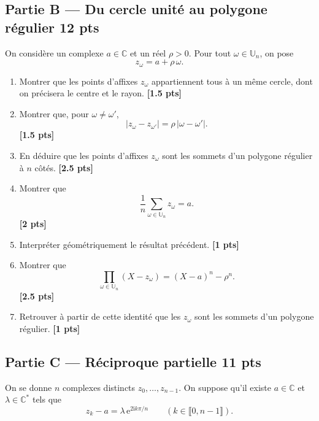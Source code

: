 \documentclass[11pt,a4paper]{article}
\newcommand{\C}{\mathbb{C}}
\newcommand{\U}{\mathbb{U}}
\newcommand{\ii}{\mathrm{i}}
\newcommand{\e}{\mathrm{e}}
\newcommand{\bareme}[1]{\hfill{\small\textbf{[#1 pts]}}}
\begin{document}
\subsection*{Partie B --- Du cercle unité au polygone régulier \hfill \textbf{12 pts}}

On considère un complexe \(a\in\C\) et un réel \(\rho>0\). Pour tout \(\omega\in\U_n\), on pose
\[
z_\omega=a+\rho\,\omega.
\]

\begin{enumerate}[label=\textbf{B.\arabic*.}]
    \item Montrer que les points d'affixes \(z_\omega\) appartiennent tous à un même cercle, dont on précisera le centre et le rayon.
    \bareme{1.5}

    \item Montrer que, pour \(\omega\neq \omega'\),
    \[
    |z_\omega-z_{\omega'}|=\rho\,|\omega-\omega'|.
    \]
    \bareme{1.5}

    \item En déduire que les points d'affixes \(z_\omega\) sont les sommets d'un polygone régulier à \(n\) côtés.
    \bareme{2.5}

    \item Montrer que
    \[
    \frac1n\sum_{\omega\in\U_n} z_\omega=a.
    \]
    \bareme{2}

    \item Interpréter géométriquement le résultat précédent.
    \bareme{1}

    \item Montrer que
    \[
    \prod_{\omega\in\U_n}(X-z_\omega)=(X-a)^n-\rho^n.
    \]
    \bareme{2.5}

    \item Retrouver à partir de cette identité que les \(z_\omega\) sont les sommets d'un polygone régulier.
    \bareme{1}
\end{enumerate}

\subsection*{Partie C --- Réciproque partielle \hfill \textbf{11 pts}}

On se donne \(n\) complexes distincts \(z_0,\dots,z_{n-1}\). On suppose qu'il existe \(a\in\C\) et \(\lambda\in\C^\ast\) tels que
\[
z_k-a=\lambda\,\e^{2\ii k\pi/n}
\qquad (k\in\llbracket 0,n-1\rrbracket).
\]
\end{document}
